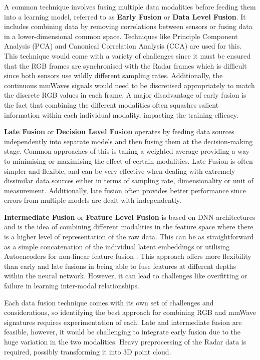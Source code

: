 \documentclass{interim}
\begin{document}
A common technique involves fusing multiple data modalities before feeding them into a learning model, referred to as \textbf{Early Fusion} or \textbf{Data Level Fusion}. It includes combining data by removing correlations between sensors or fusing data in a lower-dimensional common space. Techniques like Principle Component Analysis (PCA) and Canonical Correlation Analysis (CCA) are used for this. This technique would come with a variety of challenges since it must be ensured that the RGB frames are synchronised with the Radar frames which is difficult since both sensors use wildly different sampling rates. Additionally, the continuous mmWaves signals would need to be discretised appropriately to match the discrete RGB values in each frame. A major disadvantage of early fusion is the fact that combining the different modalities often squashes salient information within each individual modality, impacting the training efficacy.

\textbf{Late Fusion} or \textbf{Decision Level Fusion} operates by feeding data sources independently into separate models and then fusing them at the decision-making stage. Common approaches of this is taking a weighted average providing a way to minimising or maximising the effect of certain modalities. Late Fusion is often simpler and flexible, and can be very effective when dealing with extremely dissimilar data sources either in terms of sampling rate, dimensionality or unit of measurement. Additionally, late fusion often provides better performance since errors from multiple models are dealt with independently.

\textbf{Intermediate Fusion} or \textbf{Feature Level Fusion} is based on DNN architectures and is the idea of combining different modalities in the feature space where there is a higher level of representation of the raw data. This can be as straightforward as a simple concatenation of the individual latent embeddings or utilising Autoencoders for non-linear feature fusion \cite{charte2018practical}. This approach offers more flexibility than early and late fusions in being able to fuse features at different depths within the neural network. However, it can lead to challenges like overfitting or failure in learning inter-modal relationships.

Each data fusion technique comes with its own set of challenges and considerations, so identifying the best approach for combining RGB and mmWave signatures requires experimentation of each. Late and intermediate fusion are feasible, however, it would be challenging to integrate early fusion due to the huge variation in the two modalities. Heavy preprocessing of the Radar data is required, possibly transforming it into 3D point cloud. 
\end{document}
